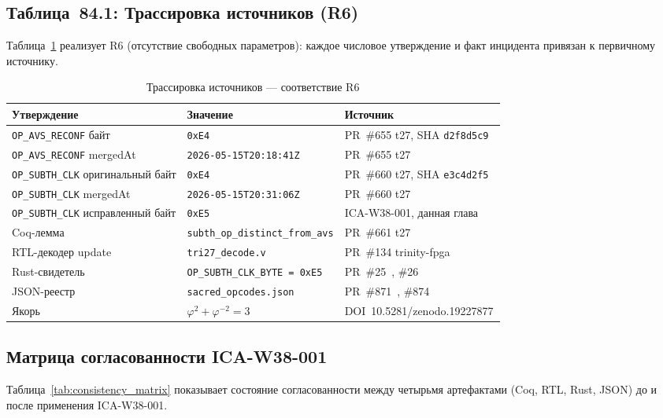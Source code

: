 \subsection{Таблица~84.1: Трассировка источников (R6)}
\label{sec:coeff_table}

Таблица~\ref{tab:source_traceability} реализует R6 (отсутствие
свободных параметров): каждое числовое утверждение и факт инцидента
привязан к первичному источнику.

\begin{table}[ht]
\centering
\caption{Трассировка источников — соответствие R6}
\label{tab:source_traceability}
\begin{tabular}{p{4cm}p{2.5cm}p{6cm}}
\hline
Утверждение & Значение & Источник \\
\hline
\texttt{OP\_AVS\_RECONF} байт & \texttt{0xE4} & PR~\#655 t27, SHA \texttt{d2f8d5c9}~\cite{pr655_t27} \\
\texttt{OP\_AVS\_RECONF} mergedAt & \texttt{2026-05-15T20:18:41Z} & PR~\#655 t27~\cite{pr655_t27} \\
\texttt{OP\_SUBTH\_CLK} оригинальный байт & \texttt{0xE4} & PR~\#660 t27, SHA \texttt{e3c4d2f5}~\cite{pr660_t27} \\
\texttt{OP\_SUBTH\_CLK} mergedAt & \texttt{2026-05-15T20:31:06Z} & PR~\#660 t27~\cite{pr660_t27} \\
\texttt{OP\_SUBTH\_CLK} исправленный байт & \texttt{0xE5} & ICA-W38-001, данная глава \\
Coq-лемма & \texttt{subth\_op\_distinct\_from\_avs} & PR~\#661 t27~\cite{pr661_t27} \\
RTL-декодер update & \texttt{tri27\_decode.v} & PR~\#134 trinity-fpga~\cite{pr_trinity_fpga_134} \\
Rust-свидетель & \texttt{OP\_SUBTH\_CLK\_BYTE = 0xE5} & PR~\#25~\cite{pr_tt25}, \#26~\cite{pr_tt26} \\
JSON-реестр & \texttt{sacred\_opcodes.json} & PR~\#871~\cite{pr_trios_871}, \#874~\cite{pr_trios_874} \\
Якорь & $\varphi^2 + \varphi^{-2} = 3$ & DOI~10.5281/zenodo.19227877 \\
\hline
\end{tabular}
\end{table}

\subsection{Матрица согласованности ICA-W38-001}

Таблица~\ref{tab:consistency_matrix} показывает состояние согласованности
между четырьмя артефактами (Coq, RTL, Rust, JSON) до и после применения
ICA-W38-001.

